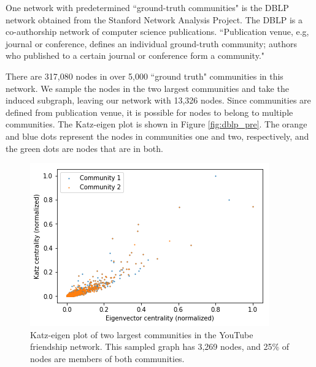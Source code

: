 \documentclass{IEEEtran}
\begin{document}
	One network with predetermined ``ground-truth communities" is the DBLP network\cite{DBLP} obtained from the Stanford Network Analysis Project\cite{SNAP}. The DBLP is a co-authorship network of computer science publications. ``Publication venue, e.g, journal or conference, defines an individual ground-truth community; authors who published to a certain journal or conference form a community."
	
	There are 317,080 nodes in over 5,000 ``ground truth" communities in this network. We sample the nodes in the two largest communities and take the induced subgraph, leaving our network with 13,326 nodes. Since communities are defined from publication venue, it is possible for nodes to belong to multiple communities. The Katz-eigen plot is shown in Figure \ref{fig:dblp_pre}. The orange and blue dots represent the nodes in communities one and two, respectively, and the green dots are nodes that are in both.
	
	\begin{figure}
		\centering
		\includegraphics[width=0.98\linewidth]{youtube.png}
		\caption{Katz-eigen plot of two largest communities in the YouTube friendship network. This sampled graph has 3,269 nodes, and 25\% of nodes are members of both communities. %
		}
		\label{fig:youtube}
	\end{figure}
	
\end{document}
